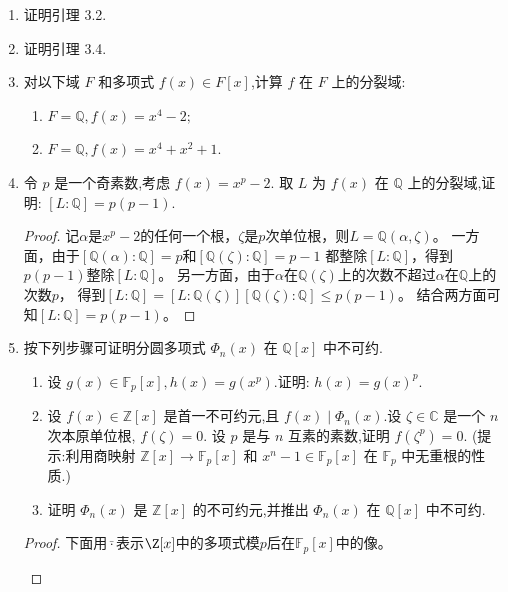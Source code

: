 \begin{enumerate}
\item 证明引理 3.2.

\item 证明引理 3.4.

\item 对以下域 $ F $ 和多项式 $ f(x) \in F[x] $,计算 $ f $ 在 $ F $ 上的分裂域:
\begin{enumerate}[label=(\arabic*)]
    \item $ F = \mathbb{Q}, f(x) = x^4 - 2; $
    \item $ F = \mathbb{Q}, f(x) = x^4 + x^2 + 1. $
\end{enumerate}

\item 令 $ p $ 是一个奇素数,考虑 $ f(x) = x^p - 2 $.
取 $ L $ 为 $ f(x) $ 在 $ \mathbb{Q} $ 上的分裂域,证明: $ [L : \mathbb{Q}] = p(p - 1)$.
\begin{proof}
    记$\alpha$是$x^p-2$的任何一个根，$\zeta$是$p$次单位根，则$L=\mathbb{Q}(\alpha,\zeta)$。
    一方面，由于$[\mathbb{Q}(\alpha):\mathbb{Q}]=p$和$[\mathbb{Q}(\zeta):\mathbb{Q}]=p-1$
    都整除$[L:\mathbb{Q}]$，得到$p(p-1)$整除$[L:\mathbb{Q}]$。
    另一方面，由于$\alpha$在$\mathbb{Q}(\zeta)$上的次数不超过$\alpha$在$\mathbb{Q}$上的次数$p$，
    得到$[L:\mathbb{Q}]=[L:\mathbb{Q}(\zeta)][\mathbb{Q}(\zeta):\mathbb{Q}] \leqslant p(p-1)$。
    结合两方面可知$[L:\mathbb{Q}]=p(p-1)$。
\end{proof}
\item 按下列步骤可证明分圆多项式 $ \varPhi_n(x) $ 在 $ \mathbb{Q}[x] $ 中不可约.
\begin{enumerate}[label=(\arabic*)]
    \item 设 $ g(x) \in \mathbb{F}_p[x], h(x) = g(x^p) $.证明: $ h(x) = g(x)^p. $
    \item 设 $ f(x) \in \mathbb{Z}[x] $ 是首一不可约元,且 $ f(x) \mid \varPhi_n(x) $.设 $ \zeta \in \mathbb{C} $ 是一个 $ n $ 次本原单位根, $ f(\zeta) = 0 $.
    设 $ p $ 是与 $ n $ 互素的素数,证明 $ f(\zeta^p) = 0 $. (提示:利用商映射 $ \mathbb{Z}[x] \to \mathbb{F}_p[x] $ 和 $ x^n - 1 \in \mathbb{F}_p[x] $ 在 $ \mathbb{F}_p $ 中无重根的性质.)
    \item 证明 $ \varPhi_n(x) $ 是 $ \mathbb{Z}[x] $ 的不可约元,并推出 $ \varPhi_n(x) $ 在 $ \mathbb{Q}[x] $ 中不可约.
\end{enumerate}
\begin{proof}
    下面用$\bar{\cdot}$表示$\Z[x]$中的多项式模$p$后在$\mathbb{F}_p[x]$中的像。
    \begin{enumerate}[label=(\arabic*)]

\end{enumerate}
\end{proof}
\end{enumerate}

